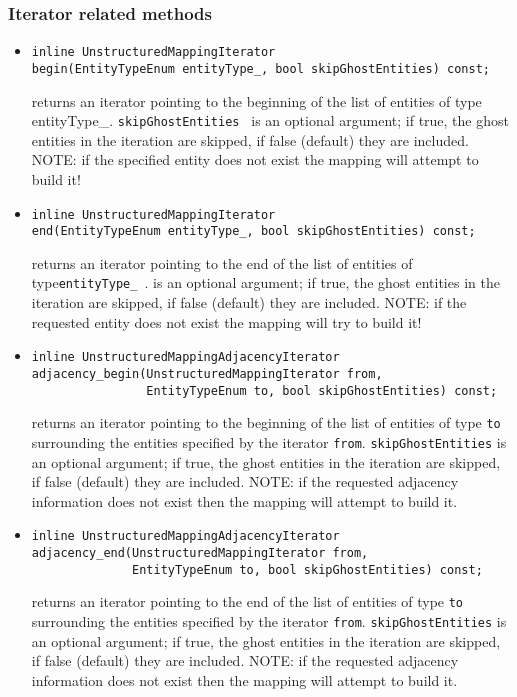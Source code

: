\subsubsection{Iterator related methods}
\begin{itemize}
\item \begin{verbatim} 
inline UnstructuredMappingIterator 
begin(EntityTypeEnum entityType_, bool skipGhostEntities) const;
\end{verbatim}
returns an iterator pointing to the beginning of the list of entities of type entityType\_.  {\tt skipGhostEntities } is
an optional argument; if true, the ghost entities in the iteration are skipped, if false (default) they are included. NOTE: if
the specified entity does not exist the mapping will attempt to build it!

\item \begin{verbatim}
inline UnstructuredMappingIterator 
end(EntityTypeEnum entityType_, bool skipGhostEntities) const;
\end{verbatim}
returns an iterator pointing to the end of the list of entities of type{\tt  entityType\_ }.  
 is
an optional argument; if true, the ghost entities in the iteration are skipped, if false (default) they are included. NOTE: if
the requested entity does not exist the mapping will try to build it!

\item \begin{verbatim}
inline UnstructuredMappingAdjacencyIterator 
adjacency_begin(UnstructuredMappingIterator from, 
                EntityTypeEnum to, bool skipGhostEntities) const;
\end{verbatim}
returns an iterator pointing to the beginning of the list of entities of type {\tt to} surrounding the entities specified
by the iterator {\tt from}.  {\tt skipGhostEntities} is an optional argument; if true, the ghost 
entities in the iteration are skipped, if false (default) they are included. NOTE: if the requested adjacency information does not
exist then the mapping will attempt to build it.

\item \begin{verbatim}
inline UnstructuredMappingAdjacencyIterator 
adjacency_end(UnstructuredMappingIterator from, 
              EntityTypeEnum to, bool skipGhostEntities) const; 
\end{verbatim}
returns an iterator pointing to the end of the list of entities of type {\tt to} surrounding the entities specified
by the iterator {\tt from}.  {\tt skipGhostEntities} is an optional argument; if true, the ghost 
entities in the iteration are skipped, if false (default) they are included.  NOTE: if the requested adjacency information does not
exist then the mapping will attempt to build it.


\end{itemize}
